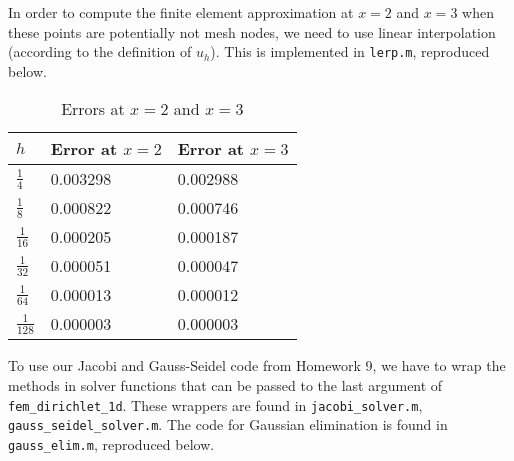 \documentclass{homework}
\begin{document}
\begin{alphaparts}
		In order to compute the finite element approximation at $x=2$ and $x=3$ when these points are potentially not mesh nodes, we need to use linear interpolation (according to the definition of $u_h$). This is implemented in \verb*|lerp.m|, reproduced below.
		
		\begin{table}[h]
			\centering
			\begin{tabular}{@{}lll@{}}
				\toprule
				$h$ & Error at $x=2$ & Error at $x=3$ \\
				\midrule
				$\frac{1}{4}$ & 0.003298 & 0.002988 \\[.4em]
				$\frac{1}{8}$ & 0.000822 & 0.000746 \\[.4em]
				$\frac{1}{16}$ & 0.000205 & 0.000187 \\[.4em]
				$\frac{1}{32}$ & 0.000051 & 0.000047 \\[.4em]
				$\frac{1}{64}$ & 0.000013 & 0.000012 \\[.4em]
				$\frac{1}{128}$ & 0.000003 & 0.000003 \\[.4em]
				\bottomrule
			\end{tabular}
			\caption{Errors at $x=2$ and $x=3$}
			\label{table:errors23}
		\end{table}
	\end{alphaparts}
	
	\question
	To use our Jacobi and Gauss-Seidel code from Homework 9, we have to wrap the methods in solver functions that can be passed to the last argument of \verb*|fem_dirichlet_1d|. These wrappers are found in \verb*|jacobi_solver.m|, \verb*|gauss_seidel_solver.m|. The code for Gaussian elimination is found in \verb*|gauss_elim.m|, reproduced below.
	
	
\end{document}
